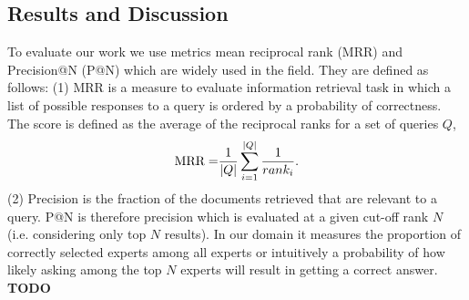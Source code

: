 \documentclass[conference]{IEEEtran}
\newcommand{\TODO}[0]{{\color{BrickRed}\textbf{TODO}}}
\begin{document}
\subsection{Results and Discussion}
To evaluate our work we use metrics mean reciprocal rank (MRR) and Precision@N (P@N) which are widely used in the field. They are defined as follows: (1) MRR is a measure to evaluate information retrieval task in which a list of possible responses to a query is ordered by a probability of correctness. The score is defined as the average of the reciprocal ranks for a set of queries $Q$,
$$
	{\rm MRR = }\frac{1}{|Q|}\sum_{i=1}^{|Q|}\frac{1}{rank_i}.
$$
(2) Precision is the fraction of the documents retrieved that are relevant to a query. P@N is therefore precision which is evaluated at a given cut-off rank $N$ (i.e. considering only top $N$ results). In our domain it measures the proportion of correctly selected experts among all experts or intuitively a probability of how likely asking among the top $N$ experts will result in getting a correct answer.
\TODO
\end{document}
